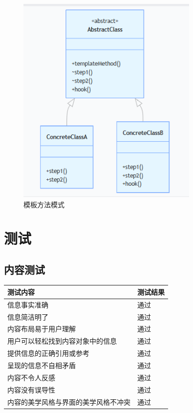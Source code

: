 \documentclass[12pt]{ctexart} %
\begin{document}
\begin{figure}[H]
  \centering
  \includegraphics[width=0.8\textwidth]{moshi.png}
  \caption{模板方法模式}
\end{figure}
\section{测试}
\subsection{内容测试}
\begin{table}[H]
\centering
\renewcommand{\arraystretch}{1.5} 
\large
\begin{tabular}{|>{\centering\arraybackslash}m{10cm}|>{\centering\arraybackslash}m{3cm}|}
\hline
\textbf{测试内容} & \textbf{测试结果} \\
\hline
信息事实准确 & 通过 \\
\hline
信息简洁明了 & 通过 \\
\hline
内容布局易于用户理解 & 通过 \\
\hline
用户可以轻松找到内容对象中的信息 & 通过 \\
\hline
提供信息的正确引用或参考 & 通过 \\
\hline
呈现的信息不自相矛盾 & 通过 \\
\hline
内容不令人反感 & 通过 \\
\hline
内容没有误导性 & 通过 \\
\hline
内容的美学风格与界面的美学风格不冲突 & 通过 \\
\hline
\end{tabular}
\label{tab:test_results}
\end{table}
\end{document}
